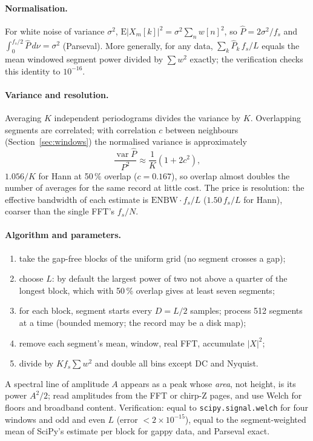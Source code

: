 \documentclass[10pt,letterpaper]{article}
\numberwithin{equation}{section}
\begin{document}
\paragraph{Normalisation.} For white noise of variance $\sigma^2$,
$\mathrm{E}|X_m[k]|^2 = \sigma^2\sum_n w[n]^2$, so $\hat{P} = 2\sigma^2/f_s$ and
$\int_0^{f_s/2}\hat{P}\,d\nu = \sigma^2$ (Parseval). More generally, for any
data, $\sum_k \hat{P}_k\,f_s/L$ equals the mean windowed segment power divided by
$\sum w^2$ exactly; the verification checks this identity to $10^{-16}$.

\paragraph{Variance and resolution.} Averaging $K$ independent periodograms
divides the variance by $K$. Overlapping segments are correlated; with
correlation $c$ between neighbours (Section~\ref{sec:windows}) the normalised
variance is approximately
\begin{equation}
\frac{\operatorname{var}\hat{P}}{P^2} \approx \frac{1}{K}\left(1 + 2c^2\right),
\end{equation}
$1.056/K$ for Hann at 50\,\% overlap ($c = 0.167$), so overlap
almost doubles the number of averages for the same record at little cost. The
price is resolution: the effective bandwidth of each estimate is
$\mathrm{ENBW}\cdot f_s/L$ ($1.50\,f_s/L$ for Hann), coarser than the
single FFT's $f_s/N$.

\paragraph{Algorithm and parameters.}
\begin{enumerate}
\item take the gap-free blocks of the uniform grid (no segment crosses a gap);
\item choose $L$: by default the largest power of two not above a quarter of the
longest block, which with 50\,\% overlap gives at least seven segments;
\item for each block, segment starts every $D = L/2$ samples; process 512
segments at a time (bounded memory; the record may be a disk map);
\item remove each segment's mean, window, real FFT, accumulate $|X|^2$;
\item divide by $K f_s\sum w^2$ and double all bins except DC and Nyquist.
\end{enumerate}
A spectral line of amplitude $A$ appears as a peak whose \emph{area}, not
height, is its power $A^2/2$; read amplitudes from the FFT or chirp-Z pages,
and use Welch for floors and broadband content. Verification: equal to
\texttt{scipy.signal.welch} for four windows and odd and even $L$ (error
$<2\times10^{-15}$), equal to the segment-weighted mean of SciPy's estimate per
block for gappy data, and Parseval exact.
\end{document}
